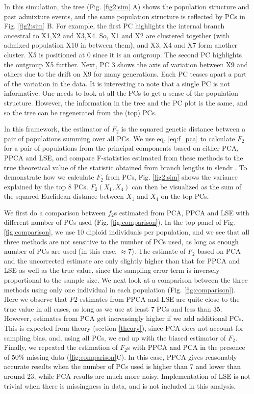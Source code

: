 \documentclass[12pt, letterpaper]{article}
\begin{document}
In this simulation, the tree (Fig. \ref{fig2:sim} A) shows the population structure and past admixture events, and the same population structure is reflected by PCs in Fig. \ref{fig2:sim} B. For example, the first PC highlights the internal branch ancestral to X1,X2 and X3,X4. So, X1 and X2 are clustered together (with admixed population X10 in between them), and X3, X4 and X7 form another cluster. X5 is positioned at 0 since it is an outgroup. The second PC highlights the outgroup X5 further. Next, PC 3 shows the axis of variation between X9 and others due to the drift on X9 for many generations. Each PC teases apart a part of the variation in the data. It is interesting to note that a single PC is not informative. One needs to look at all the PCs to get a sense of the population structure. However, the information in the tree and the PC plot is the same, and so the tree can be regenerated from the (top) PCs. 

In this framework, the estimator of $F_2$ is the squared genetic distance between a pair of populations summing over all PCs. We use eq. \ref{eq:f_pca} to calculate $F_2$ for a pair of populations from the principal components based on either PCA, PPCA and LSE, and compare F-statistics estimated from these methods to the true theoretical value of the statistic obtained from branch lengths in slendr \cite{petr_slendr_2022}. To demonstrate how we calculate $F_2$ from PCs, Fig. \ref{fig2:sim} shows the variance explained by the top 8 PCs. $F_2(X_1, X_4)$ can then be visualized as the sum of the squared Euclidean distance between $X_1$ and $X_4$ on the top PCs.

We first do a comparison between $f_2$s estimated from PCA, PPCA and LSE with different number of PCs used (Fig. \ref{fig:comparison}). In the top panel of Fig. \ref{fig:comparison}, we use 10 diploid individuals per population, and we see that all three methods are not sensitive to the number of PCs used, as long as enough number of PCs are used (in this case, $\approx 7$). The estimate of $F_2$ based on PCA and the uncorrected estimate are only slightly higher than that for PPCA and LSE as well as the true value, since the sampling error term is inversely proportional to the sample size. We next look at a comparison between the three methods using only one individual in each population (Fig. \ref{fig:comparison}). Here we observe that $F2$ estimates from PPCA and LSE are quite close to the true value in all cases, as long as we use at least $7$ PCs and less than $35$. However, estimates from PCA get increasingly higher if we add additional PCs. This is expected from theory (section \ref{theory}), since PCA does not account for sampling bias, and, using all PCs, we end up with the biased estimator of $F_2$. Finally, we repeated the estimation of $F_2$s with PPCA and PCA in the presence of $50\%$ missing data (\ref{fig:comparison}C). In this case, PPCA gives reasonably accurate results when the number of PCs used is higher than 7 and lower than around 23, while PCA results are much more noisy. Implementation of LSE is not trivial when there is missingness in data, and is not included in this analysis. 
\end{document}
